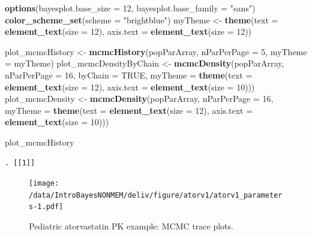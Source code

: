 \documentclass[]{article}
\newenvironment{Shaded}{\begin{snugshade}}{\end{snugshade}}
\newcommand{\KeywordTok}[1]{\textcolor[rgb]{0.13,0.29,0.53}{\textbf{{#1}}}}
\newcommand{\DataTypeTok}[1]{\textcolor[rgb]{0.13,0.29,0.53}{{#1}}}
\newcommand{\DecValTok}[1]{\textcolor[rgb]{0.00,0.00,0.81}{{#1}}}
\newcommand{\StringTok}[1]{\textcolor[rgb]{0.31,0.60,0.02}{{#1}}}
\newcommand{\OtherTok}[1]{\textcolor[rgb]{0.56,0.35,0.01}{{#1}}}
\newcommand{\NormalTok}[1]{{#1}}
\begin{document}
\begin{Shaded}
\begin{Highlighting}[]
\KeywordTok{options}\NormalTok{(}\DataTypeTok{bayesplot.base_size =} \DecValTok{12}\NormalTok{,}
        \DataTypeTok{bayesplot.base_family =} \StringTok{"sans"}\NormalTok{)}
\KeywordTok{color_scheme_set}\NormalTok{(}\DataTypeTok{scheme =} \StringTok{"brightblue"}\NormalTok{)}
\NormalTok{myTheme <-}\StringTok{ }\KeywordTok{theme}\NormalTok{(}\DataTypeTok{text =} \KeywordTok{element_text}\NormalTok{(}\DataTypeTok{size =} \DecValTok{12}\NormalTok{), }
                 \DataTypeTok{axis.text =} \KeywordTok{element_text}\NormalTok{(}\DataTypeTok{size =} \DecValTok{12}\NormalTok{))}

\NormalTok{plot_mcmcHistory <-}\StringTok{ }\KeywordTok{mcmcHistory}\NormalTok{(popParArray,}
                                 \DataTypeTok{nParPerPage =} \DecValTok{5}\NormalTok{, }\DataTypeTok{myTheme =} \NormalTok{myTheme)}
\NormalTok{plot_mcmcDensityByChain <-}\StringTok{ }\KeywordTok{mcmcDensity}\NormalTok{(popParArray, }
                                        \DataTypeTok{nParPerPage =} \DecValTok{16}\NormalTok{, }\DataTypeTok{byChain =} \OtherTok{TRUE}\NormalTok{, }
                                        \DataTypeTok{myTheme =} \KeywordTok{theme}\NormalTok{(}\DataTypeTok{text =} \KeywordTok{element_text}\NormalTok{(}\DataTypeTok{size =} \DecValTok{12}\NormalTok{), }
                                                        \DataTypeTok{axis.text =} \KeywordTok{element_text}\NormalTok{(}\DataTypeTok{size =} \DecValTok{10}\NormalTok{)))}
\NormalTok{plot_mcmcDensity <-}\StringTok{ }\KeywordTok{mcmcDensity}\NormalTok{(popParArray, }\DataTypeTok{nParPerPage =} \DecValTok{16}\NormalTok{, }
                                 \DataTypeTok{myTheme =} \KeywordTok{theme}\NormalTok{(}\DataTypeTok{text =} \KeywordTok{element_text}\NormalTok{(}\DataTypeTok{size =} \DecValTok{12}\NormalTok{), }
                                                 \DataTypeTok{axis.text =} \KeywordTok{element_text}\NormalTok{(}\DataTypeTok{size =} \DecValTok{10}\NormalTok{)))}

\NormalTok{plot_mcmcHistory}
\end{Highlighting}
\end{Shaded}

\begin{verbatim}
. [[1]]
\end{verbatim}

\begin{figure}[htbp]
\centering
\texttt{[image: /data/IntroBayesNONMEM/deliv/figure/atorv1/atorv1\_parameters-1.pdf]}
\caption{Pediatric atorvastatin PK example: MCMC trace plots.}
\end{figure}
\end{document}
